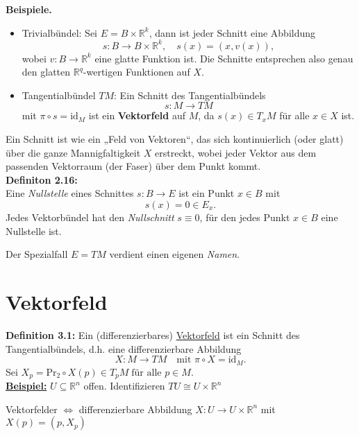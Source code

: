 \documentclass[fleqn, 12pt, letterpaper]{article}
\newcommand{\txt}[1]{\text{#1}}
\begin{document}
\textbf{Beispiele.}
\begin{itemize}
    \item Trivialbündel: Sei \( E = B \times \mathbb{R}^k \), dann ist jeder Schnitt eine Abbildung
    \[
    s: B \to B \times \mathbb{R}^k, \quad s(x) = (x, v(x)),
    \]
    wobei \( v: B \to \mathbb{R}^k \) eine glatte Funktion ist. Die Schnitte entsprechen also genau den glatten \( \mathbb{R}^q \)-wertigen Funktionen auf \( X \).

    \item Tangentialbündel \( TM \): Ein Schnitt des Tangentialbündels
    \[
    s: M \to TM
    \]
    mit \( \pi \circ s = \mathrm{id}_M \) ist ein \textbf{Vektorfeld} auf \( M \), da \( s(x) \in T_xM \) für alle \( x \in X \) ist.
\end{itemize}
Ein Schnitt ist wie ein „Feld von Vektoren“, das sich kontinuierlich (oder glatt) über die ganze Mannigfaltigkeit $X$ erstreckt, wobei jeder Vektor aus dem passenden Vektorraum (der Faser) über dem Punkt kommt.\\

\textbf{Definiton 2.16:} \\
Eine \emph{Nullstelle} eines Schnittes \(s: B \to E\) ist ein Punkt \(x \in B\) mit
\[
s(x)=0 \in E_x.
\]
Jedes Vektorbündel hat den \emph{Nullschnitt} \(s \equiv 0\), für den jedes Punkt \(x \in B\) eine Nullstelle ist.


Der Spezialfall \( E = TM \) verdient einen eigenen \textit{Namen}.
\section{Vektorfeld}
\bigskip
\textbf{Definition 3.1:} Ein (differenzierbares) \underline{Vektorfeld} ist ein Schnitt des Tangentialbündels, d.h. eine differenzierbare Abbildung 
\[
X \colon M \to TM \quad \txt{mit } \pi \circ X =\mathrm{id}_M.
\]
Sei $ X_p = \mathrm{Pr}_2 \circ X(p) \in T_pM \;\text{für alle } p \in M.$\\

\textbf{\underline{Beispiel:}} \quad
\( U \subseteq \mathbb{R}^n \) offen. \quad
Identifizieren \( TU \cong U \times \mathbb{R}^n \)

\bigskip

\noindent
Vektorfelder \quad \( \Longleftrightarrow \) \quad differenzierbare Abbildung \( X \colon U \to U \times \mathbb{R}^n \) mit \( X(p) = (p,X_p) \)
\end{document}
